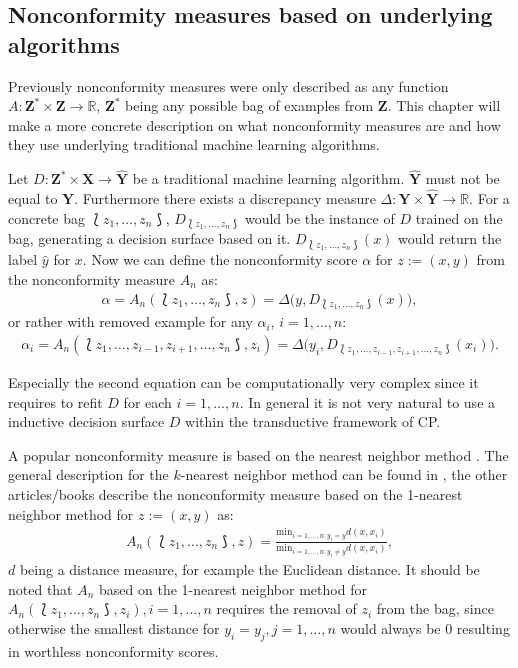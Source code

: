 \documentclass[twoside,11pt]{article}
\begin{document}
\subsection{Nonconformity measures based on underlying
            algorithms}
\label{subsec:ncs}

Previously nonconformity measures were only described as
any function
$A: \textbf{Z}^* \times \textbf{Z} \rightarrow \mathbb{R}$,
$\textbf{Z}^*$ being any possible bag of examples from
$\textbf{Z}$. This chapter will make a more concrete
description on what nonconformity measures are and how they
use underlying traditional machine learning algorithms.

Let $D:\textbf{Z}^* \times \textbf{X} \rightarrow
\hat{\textbf{Y}}$ be a traditional machine learning
algorithm. $\hat{\textbf{Y}}$ must not be equal to
$\textbf{Y}$. Furthermore there exists a discrepancy
measure $\Delta: \textbf{Y} \times \hat{\textbf{Y}}
\rightarrow \mathbb{R}$.
For a concrete bag $\Lbag z_1,\dots,z_n \Rbag$,
$D_{\Lbag z_1,\dots,z_n \Rbag}$ would be the instance of
$D$ trained on the bag, generating a decision surface based
on it. $D_{\Lbag z_1,\dots,z_n \Rbag}(x)$ would return the
label $\hat{y}$ for $x$. Now we can define the
nonconformity score $\alpha$ for $z := (x, y)$ from the
nonconformity measure $A_n$ as:
\begin{align*}
  \alpha=A_n(\Lbag z_1,\dots,z_n \Rbag, z)=
  \Delta\big(y,D_{\Lbag z_1,\dots,z_n \Rbag}(x)\big),
\end{align*}
or rather with removed example for any $\alpha_i$,
$i = 1,\dots,n$:
\begin{align*}
  \alpha_i = A_n(\Lbag z_1,\dots,z_{i-1},z_{i+1},\dots,z_n
  \Rbag, z_i) = \Delta\big(y_i,D_{\Lbag z_1,\dots,z_{i-1},
  z_{i+1},\dots,z_n \Rbag}(x_i)\big).
\end{align*}

Especially the second equation can be computationally very
complex since it requires to refit $D$ for each
$i = 1,\dots,n$. In general it is not very natural to
use a inductive decision surface $D$ within the
transductive framework of CP.

A popular nonconformity measure is based on the nearest
neighbor method \citep[see][]{alrw,shafer_et_al_2008,cprml,
  smirnov_et_al_2009}.
The general description for the $k$-nearest neighbor method
can be found in \citet{smirnov_et_al_2009}, the other
articles/books describe the nonconformity measure based on
the 1-nearest neighbor method for $z:=(x,y)$ as:
\begin{align*}
  A_n(\Lbag z_1,\dots,z_n \Rbag, z) =
  \frac{\text{min}_{i=1,\dots,n:y_i = y} d(x,x_i)}
       {\text{min}_{i=1,\dots,n:y_i \neq y} d(x,x_i)},
\end{align*}
$d$ being a distance measure, for example the Euclidean
distance. It should be noted that $A_n$ based on the
1-nearest neighbor method for
$A_n(\Lbag z_1,\dots,z_n \Rbag, z_i), i=1,\dots,n$ requires
the removal of $z_i$ from the bag, since otherwise the
smallest distance for $y_i = y_j,j=1,\dots,n$ would always
be 0 resulting in worthless nonconformity scores.
\end{document}
